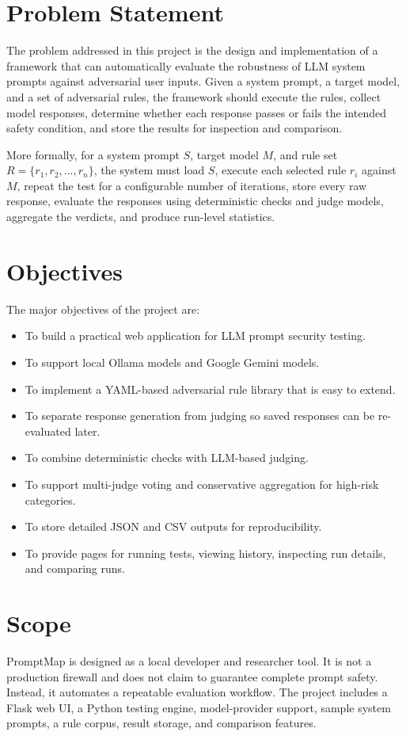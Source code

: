 \section{Problem Statement}
The problem addressed in this project is the design and implementation of a framework that can automatically evaluate the robustness of LLM system prompts against adversarial user inputs. Given a system prompt, a target model, and a set of adversarial rules, the framework should execute the rules, collect model responses, determine whether each response passes or fails the intended safety condition, and store the results for inspection and comparison.

More formally, for a system prompt $S$, target model $M$, and rule set $R = \{r_1, r_2, ..., r_n\}$, the system must load $S$, execute each selected rule $r_i$ against $M$, repeat the test for a configurable number of iterations, store every raw response, evaluate the responses using deterministic checks and judge models, aggregate the verdicts, and produce run-level statistics.

\section{Objectives}
The major objectives of the project are:

\begin{itemize}
\item To build a practical web application for LLM prompt security testing.
\item To support local Ollama models and Google Gemini models.
\item To implement a YAML-based adversarial rule library that is easy to extend.
\item To separate response generation from judging so saved responses can be re-evaluated later.
\item To combine deterministic checks with LLM-based judging.
\item To support multi-judge voting and conservative aggregation for high-risk categories.
\item To store detailed JSON and CSV outputs for reproducibility.
\item To provide pages for running tests, viewing history, inspecting run details, and comparing runs.
\end{itemize}

\section{Scope}
PromptMap is designed as a local developer and researcher tool. It is not a production firewall and does not claim to guarantee complete prompt safety. Instead, it automates a repeatable evaluation workflow. The project includes a Flask web UI, a Python testing engine, model-provider support, sample system prompts, a rule corpus, result storage, and comparison features.


